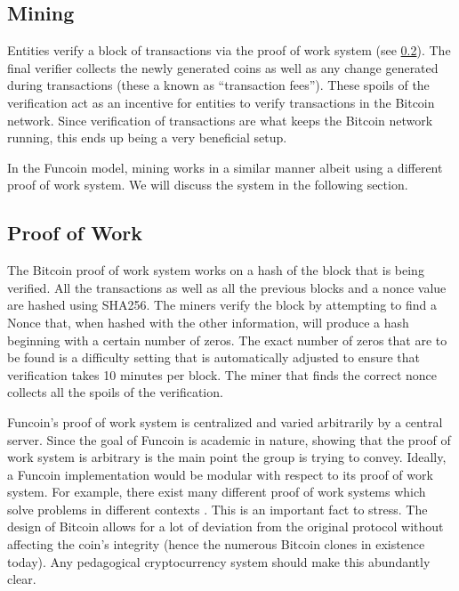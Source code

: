 \documentclass[12pt]{article}
\begin{document}
\subsection{Mining}\label{mining}
Entities verify a block of transactions via the proof of work system (see \ref{proofwork}).
The final verifier collects the newly generated coins as well as any change generated during
transactions (these a known as ``transaction fees''). These spoils of the verification act as an incentive for entities to verify transactions in the Bitcoin network. Since verification of transactions are what keeps the Bitcoin network running, this ends up being a very beneficial setup.

In the Funcoin model, mining works in a similar manner albeit using a different proof of work system. We will discuss the system in the following section.

\subsection{Proof of Work}\label{proofwork}
The Bitcoin proof of work system works on a hash of the block that is being verified. All the transactions as well as all the previous blocks and a nonce value are hashed using SHA256. The miners verify the block by attempting to find a Nonce that, when hashed with the other information, will produce a hash beginning with a certain number of zeros. The exact number of zeros that are to be found is a difficulty setting that is automatically adjusted to ensure that verification takes 10 minutes per block. The miner that finds the correct nonce collects all the spoils of the verification.

Funcoin's proof of work system is centralized and varied arbitrarily by a central server. Since the goal of Funcoin is academic in nature, showing that the proof of work system is arbitrary is the main point the group is trying to convey. Ideally, a Funcoin implementation would be modular with respect to its proof of work system. For example, there exist many different proof of work systems which solve problems in different contexts \cite{github:proofofwork}. This is an important fact to stress. The design of Bitcoin allows for a lot of deviation from the original protocol without affecting the coin's integrity (hence the numerous Bitcoin clones in existence today). Any pedagogical cryptocurrency system should make this abundantly clear.
\end{document}
